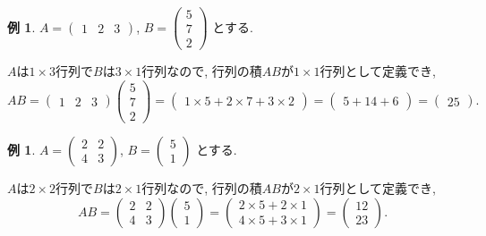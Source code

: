 \documentclass[dvipdfmx,a4paper,11pt]{article}
\theoremstyle{definition}
\newtheorem{exa}[thm]{例}
\begin{document}
 \begin{exa}
 $ A=\begin{pmatrix} 1 &2 &3 \end{pmatrix}$, 
 $ 
 B = 
 \begin{pmatrix}
5 \\7\\2
 \end{pmatrix}
 $
 とする. 
 
 $A$は$1\times 3$行列で$B$は$3 \times 1$行列なので, 行列の積$AB$が$1 \times 1$行列として定義でき, 
 $$
 AB = \begin{pmatrix}1 &2&3  \end{pmatrix}
 \begin{pmatrix}
5 \\7\\2
 \end{pmatrix}
 = \begin{pmatrix}1\times 5 + 2 \times 7 + 3 \times 2  \end{pmatrix}= 
  \begin{pmatrix}5+14+6 \end{pmatrix}= \begin{pmatrix}25 \end{pmatrix}.
 $$
 
 \end{exa}
 
  \begin{exa}
 $ A= 
 \begin{pmatrix}
2 & 2\\
4 & 3
 \end{pmatrix}
 $, $
 B = 
 \begin{pmatrix}
5 \\1
 \end{pmatrix}
 $
 とする. 
 
 $A$は$2\times 2$行列で$B$は$2 \times 1$行列なので, 行列の積$AB$が$2 \times 1$行列として定義でき, 
 $$
 AB = 
 \begin{pmatrix}
2 & 2\\
4 & 3
 \end{pmatrix}
  \begin{pmatrix}
5 \\1
 \end{pmatrix}
 =  
 \begin{pmatrix}
2\times 5 + 2\times 1 \\
4 \times 5 + 3 \times 1
 \end{pmatrix}
 = 
  \begin{pmatrix}
12 \\
23
 \end{pmatrix}.
 $$
 
 \end{exa}
 
\end{document}
